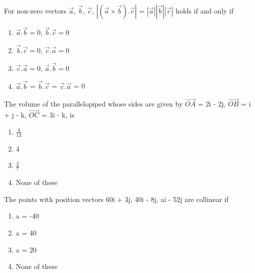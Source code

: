 \item For non-zero vectors $\overrightarrow{a}$, $\overrightarrow{b}$, $\overrightarrow{c}$, $| (\overrightarrow{a} \times \overrightarrow{b}) .  \overrightarrow{c} |$ = $|\overrightarrow{a}||\overrightarrow{b}||\overrightarrow{c}|$ holds if and only if 
\begin{enumerate}
\item $\overrightarrow{a}.\overrightarrow{b} = 0$, $\overrightarrow{b}.\overrightarrow{c} = 0$
\item $\overrightarrow{b}.\overrightarrow{c} = 0$, $\overrightarrow{c}.\overrightarrow{a} = 0$
\item $\overrightarrow{c}.\overrightarrow{a} = 0$, $\overrightarrow{a}.\overrightarrow{b} = 0$
\item $\overrightarrow{a}.\overrightarrow{b}$ = $\overrightarrow{b}.\overrightarrow{c}$  = $\overrightarrow{c}.\overrightarrow{a}$ = 0
\end{enumerate}

\item The volume of the parallelopiped whose sides are given by $\overrightarrow{OA}$ = 2i - 2j, $\overrightarrow{OB}$ = i + j - k, $\overrightarrow{OC}$ = 3i - k, is
\begin{enumerate}
\item $\frac{4}{13}$
\item 4
\item $\frac{2}{7}$
\item None of these
\end{enumerate}

\item The points with position vectors 60i + 3j, 40i - 8j, ai - 52j are collinear if
\begin{enumerate}
\item a = -40
\item a = 40
\item a = 20
\item None of these
\end{enumerate}

